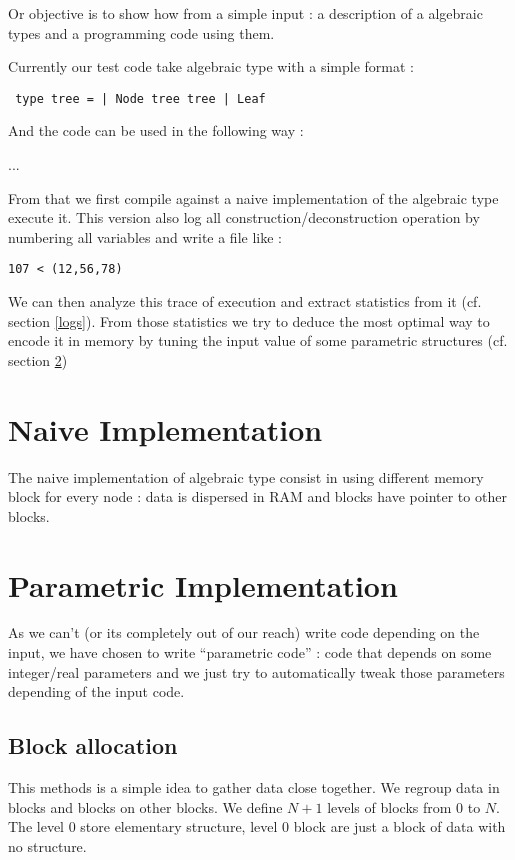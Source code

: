 \documentclass[12pt]{article}
\begin{document}
Or objective is to show how from a simple input : a description of a algebraic
types and a programming code using them.

Currently our test code take algebraic type with a simple format :

\verb$ type tree = | Node tree tree | Leaf$

And the code can be used in the following way : 

...

From that we first compile against a naive implementation of the algebraic type
execute it. This version also log all construction/deconstruction operation by
numbering all variables and write a file like :

\verb$107 < (12,56,78)$

We can then analyze this trace of execution and extract statistics from it (cf.
section \ref{logs}). From
those statistics we try to deduce the most optimal way to encode it in memory by
tuning the input value of some parametric structures (cf. section \ref{paramImplem})




\section{Naive Implementation}

The naive implementation of algebraic type consist in using different memory
block for every node : data is dispersed in RAM and blocks have pointer to
other blocks.



\section{Parametric Implementation}
\label{paramImplem}

As we can't (or its completely out of our reach) write code
depending on the input, we have chosen to write ``parametric code'' : code that
depends on some integer/real parameters and we just try to automatically tweak
those parameters depending of the input code. 

\subsection{Block allocation}

This methods is a simple idea to gather data close together. We regroup data in
blocks and blocks on other blocks. We define $N +1$ levels of blocks from 0 to
$N$. The level 0 store elementary structure, level 0 block are just a block of
data with no structure.
\end{document}

